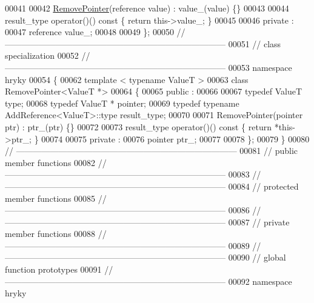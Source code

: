 \begin{DoxyCode}
00041 
00042     \hyperlink{classhryky_1_1_remove_pointer}{RemovePointer}(reference value) : value\_(value) \{\}
00043 
00044     result\_type operator()()\textcolor{keyword}{ const }\{ \textcolor{keywordflow}{return} this->value\_; \}
00045 
00046 \textcolor{keyword}{private} :
00047     reference   value\_;
00048 
00049 \};
00050 \textcolor{comment}{//
      ------------------------------------------------------------------------------}
00051 \textcolor{comment}{// class specialization}
00052 \textcolor{comment}{//
      ------------------------------------------------------------------------------}
00053 \textcolor{keyword}{namespace }hryky
00054 \{
00062 \textcolor{keyword}{template} < \textcolor{keyword}{typename} ValueT >
00063 \textcolor{keyword}{class }RemovePointer<ValueT *>
00064 \{
00065 \textcolor{keyword}{public} :
00066 
00067     \textcolor{keyword}{typedef} ValueT                                  type;
00068     \textcolor{keyword}{typedef} ValueT *                                pointer;
00069     \textcolor{keyword}{typedef} \textcolor{keyword}{typename} AddReference<ValueT>::type     result\_type;
00070 
00071     RemovePointer(pointer ptr) : ptr\_(ptr) \{\}
00072 
00073     result\_type operator()()\textcolor{keyword}{ const }\{ \textcolor{keywordflow}{return} *this->ptr\_; \}
00074 
00075 \textcolor{keyword}{private} :
00076     pointer     ptr\_;
00077 
00078 \};
00079 \}
00080 \textcolor{comment}{//
      ------------------------------------------------------------------------------}
00081 \textcolor{comment}{// public member functions}
00082 \textcolor{comment}{//
      ------------------------------------------------------------------------------}
00083 \textcolor{comment}{//
      ------------------------------------------------------------------------------}
00084 \textcolor{comment}{// protected member functions}
00085 \textcolor{comment}{//
      ------------------------------------------------------------------------------}
00086 \textcolor{comment}{//
      ------------------------------------------------------------------------------}
00087 \textcolor{comment}{// private member functions}
00088 \textcolor{comment}{//
      ------------------------------------------------------------------------------}
00089 \textcolor{comment}{//
      ------------------------------------------------------------------------------}
00090 \textcolor{comment}{// global function prototypes}
00091 \textcolor{comment}{//
      ------------------------------------------------------------------------------}
00092 \textcolor{keyword}{namespace }hryky

\end{DoxyCode}
